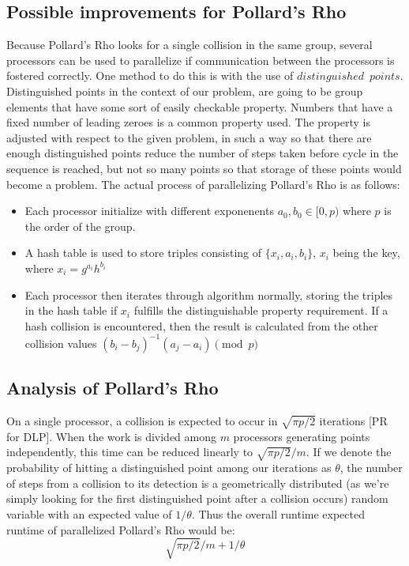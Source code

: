 \documentclass{article}
\begin{document}
  \subsection{Possible improvements for Pollard's Rho}
    Because Pollard's Rho looks for a single collision in the same group, several processors can be used to parallelize if communication between the processors is fostered correctly.
    One method to do this is with the use of $distinguished \enspace points$.  Distinguished points in the context of our problem, are going to be group elements that have some sort of easily checkable property.  Numbers that have a fixed number of leading zeroes is a common property used.  The property is adjusted with respect to the given problem, in such a way so that there are enough distinguished points reduce the number of steps taken before cycle in the sequence is reached, but not so many points so that storage of these points would become a problem.
    The actual process of parallelizing Pollard's Rho is as follows:
    \begin{itemize}
      \item Each processor initialize with different exponenents $a_0, b_0 \in [0, p)$ where $p$ is the order of the group.
      \item A hash table is used to store triples consisting of $\{x_i, a_i, b_i\}$, $x_i$ being the key, where $x_i = g^{a_i}h^{b_i}$
      \item Each processor then iterates through algorithm normally, storing the triples in the hash table if $x_i$ fulfills the distinguishable property requirement.  If a hash collision is encountered, then the result is calculated from the other collision values $(b_i-b_j)^{-1}(a_j-a_i)\pmod p$
    \end{itemize}
  \subsection{Analysis of Pollard's Rho}
    On a single processor, a collision is expected to occur in $\sqrt{\pi p/2}$ iterations [PR for DLP].  When the work is divided among $m$ processors generating points independently, this time can be reduced linearly to $\sqrt{\pi p/2}/m$.  If we denote the probability of hitting a distinguished point among our iterations as $\theta$, the number of steps from a collision to its detection is a geometrically distributed (as we're simply looking for the first distinguished point after a collision occurs) random variable with an expected value of $1/\theta$.  Thus the overall runtime expected runtime of parallelized Pollard's Rho would be: \\
      $$\sqrt{\pi p/2}/m + 1/\theta$$
\end{document}
